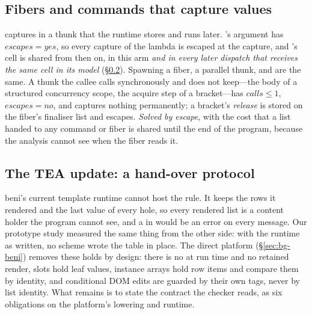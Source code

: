\subsection{Fibers and commands that capture values}
\label{sec:hard-fibers}

 captures  in a thunk that the
runtime stores and runs later. 's argument has $\mathit{escapes} = \mathit{yes}$, so
every capture of the lambda is escaped at the capture, and 's cell is shared from
then on, in this arm \emph{and in every later dispatch that receives the same cell in its model}
(\S\ref{sec:hard-tea}). Spawning a fiber, a parallel thunk,  and  are
the same. A thunk the callee calls synchronously and does not keep---the body of a structured
concurrency scope, the acquire step of a bracket---has $\mathit{calls} \le 1$,
$\mathit{escapes} = \mathit{no}$, and captures nothing permanently; a bracket's \emph{release} is stored
on the fiber's finaliser list and escapes. \emph{Solved by escape}, with the cost that a list handed to
any command or fiber is shared until the end of the program, because the analysis cannot see when the
fiber reads it.

\subsection{The TEA update: a hand-over protocol}
\label{sec:hard-tea}

beni's current template runtime cannot host the rule. It keeps the rows it rendered and the last
value of every hole, so every rendered list is a content holder the program cannot see, and a
 in  would be an error on every message. Our prototype study
measured the same thing from the other side: with the runtime as written, no scheme wrote the table
in place. The direct platform (\S\ref{sec:bg-beni}) removes these holds by design: there is no
 at run time and no retained render, slots hold leaf values, instance arrays hold row
items and compare them by identity, and conditional DOM edits are guarded by their own tags, never by
list identity. What remains is to state the contract the checker reads, as six obligations on the
platform's lowering and runtime.

